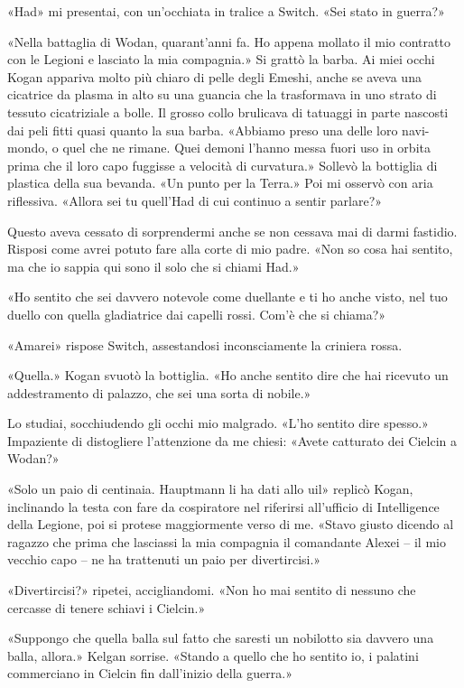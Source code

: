 «Had» mi presentai, con un'occhiata in tralice a Switch. «Sei stato in
guerra?»

«Nella battaglia di Wodan, quarant'anni fa. Ho appena mollato il mio
contratto con le Legioni e lasciato la mia compagnia.» Si grattò la
barba. Ai miei occhi Kogan appariva molto più chiaro di pelle degli
Emeshi, anche se aveva una cicatrice da plasma in alto su una guancia
che la trasformava in uno strato di tessuto cicatriziale a bolle. Il
grosso collo brulicava di tatuaggi in parte nascosti dai peli fitti
quasi quanto la sua barba. «Abbiamo preso una delle loro navi-mondo, o
quel che ne rimane. Quei demoni l'hanno messa fuori uso in orbita prima
che il loro capo fuggisse a velocità di curvatura.» Sollevò la bottiglia
di plastica della sua bevanda. «Un punto per la Terra.» Poi mi osservò
con aria riflessiva. «Allora sei tu quell'Had di cui continuo a sentir
parlare?»

Questo aveva cessato di sorprendermi anche se non cessava mai di darmi
fastidio. Risposi come avrei potuto fare alla corte di mio padre. «Non
so cosa hai sentito, ma che io sappia qui sono il solo che si chiami
Had.»

«Ho sentito che sei davvero notevole come duellante e ti ho anche visto,
nel tuo duello con quella gladiatrice dai capelli rossi. Com'è che si
chiama?»

«Amarei» rispose Switch, assestandosi inconsciamente la criniera rossa.

«Quella.» Kogan svuotò la bottiglia. «Ho anche sentito dire che hai
ricevuto un addestramento di palazzo, che sei una sorta di nobile.»

Lo studiai, socchiudendo gli occhi mio malgrado. «L'ho sentito dire
spesso.» Impaziente di distogliere l'attenzione da me chiesi: «Avete
catturato dei Cielcin a Wodan?»

«Solo un paio di centinaia. Hauptmann li ha dati allo
\foreignlanguage{italian}{uil}» replicò Kogan, inclinando la testa con
fare da cospiratore nel riferirsi all'ufficio di Intelligence della
Legione, poi si protese maggiormente verso di me. «Stavo giusto dicendo
al ragazzo che prima che lasciassi la mia compagnia il comandante Alexei
-- il mio vecchio capo -- ne ha trattenuti un paio per divertircisi.»

«Divertircisi?» ripetei, accigliandomi. «Non ho mai sentito di nessuno
che cercasse di tenere schiavi i Cielcin.»

«Suppongo che quella balla sul fatto che saresti un nobilotto sia
davvero una balla, allora.» Kelgan sorrise. «Stando a quello che ho
sentito io, i palatini commerciano in Cielcin fin dall'inizio della
guerra.»

